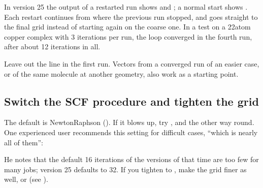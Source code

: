 \documentclass[letterpaper,10pt,english,openany,oneside]{sphinxmanual}
\begin{document}
\sphinxAtStartPar
In version 25 the output of a restarted run shows  and ; a normal start
shows . Each restart continues from where the previous run stopped, and goes straight to the
final grid instead of starting again on the coarse one. In a test on a 22\sphinxhyphen{}atom copper complex with 3 iterations per
run, the loop converged in the fourth run, after about 12 iterations in all.



\sphinxAtStartPar
Leave out the  line in the first run. Vectors from a converged run of an easier case, or of the same molecule
at another geometry, also work as a starting point.




\subsection{Switch the SCF procedure and tighten the grid}
\label{\detokenize{troubleshooting/common-problems:switch-the-scf-procedure-and-tighten-the-grid}}
\sphinxAtStartPar
The default {\hyperref[\detokenize{reference/scf:scf-procedure}]{}} is Newton\textendash{}Raphson (). If it blows up, try , and the other way
round. One experienced user recommends this setting for difficult cases, “which is nearly all of them”:



\begin{sphinxVerbatim}[commandchars=\\\{\}]
\end{sphinxVerbatim}



\sphinxAtStartPar
He notes that the default 16 iterations of the versions of that time are too few for many jobs; version 25
defaults to 32. If you tighten {\hyperref[\detokenize{reference/scf:scf-convergence}]{}} to , make the grid finer as well,  or  (see {\hyperref[\detokenize{reference/grid:grid-accuracy}]{}}).
\end{document}
